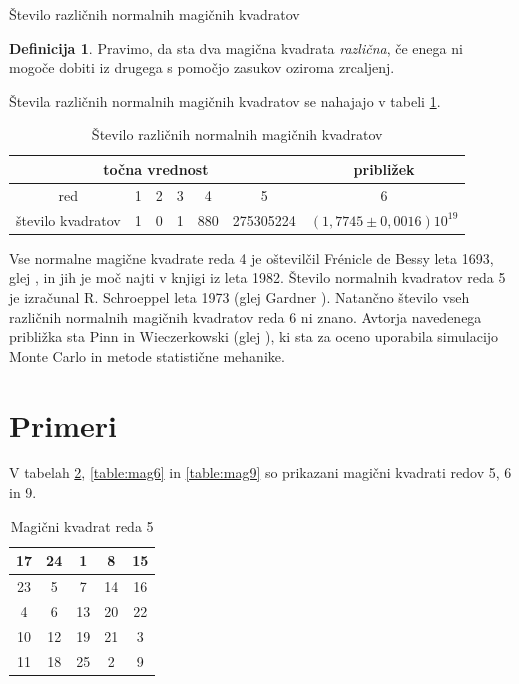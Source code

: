 \documentclass[12pt]{article}
\newcommand{\pojem}[1]{\emph{\color{purple}#1}}
\newenvironment{magic}[3]{
\begin{table}[!ht]
   \centering
   \caption{#2}
   \label{#3}
   \large
   \begin{tabular}{|*{#1}{c|}}\hline
}{
   \end{tabular}
   \normalsize
\end{table}
}
\theoremstyle{definition}
\newtheorem{definicija}{Definicija}
\theoremstyle{plain}
\begin{document}
Število različnih normalnih magičnih kvadratov

\begin{definicija}
      Pravimo, da sta dva magična kvadrata \pojem{različna}, če enega ni mogoče dobiti
      iz drugega s pomočjo zasukov oziroma zrcaljenj.
\end{definicija}

Števila različnih normalnih magičnih kvadratov se nahajajo v tabeli \ref{table:stevila}.

\begin{magic}{7}{Število različnih normalnih magičnih kvadratov}{table:stevila}
   \toprule
   \multicolumn{6}{c}{točna vrednost} & približek  \\ 
   \midrule
         red &1 &2 &3 &4 &5 &6  \\
         \hline
       število kvadratov & 1 & 0 & 1 & 880 & 275305224 & $(1{,}7745 \pm 0{,}0016)10^{19}$ \\
       \bottomrule
\end{magic}

Vse normalne magične kvadrate reda 4 je oštevilčil Frénicle de Bessy
leta 1693, glej \cite{bessy}, in jih je moč najti v knjigi \cite{berlekamp}
iz leta 1982. Število normalnih kvadratov reda 5 je izračunal
R. Schroeppel leta 1973 (glej Gardner \cite{gardner} ).
Natančno število vseh različnih normalnih magičnih kvadratov reda 6 ni znano.
Avtorja navedenega približka sta Pinn in Wieczerkowski (glej \cite{pinn}), ki
sta za oceno uporabila simulacijo Monte Carlo in metode statistične mehanike.


\section{Primeri}

V tabelah \ref{table:mag5}, \ref{table:mag6} in \ref{table:mag9} so prikazani
magični kvadrati redov 5, 6 in 9.


\begin{magic}{5}{Magični kvadrat reda 5}{table:mag5}
   17 & 24 &  1 &  8 & 15 \\\hline
   23 &  5 &  7 & 14 & 16 \\\hline
   4 &  6 & 13 & 20 & 22 \\\hline
   10 & 12 & 19 & 21 &  3 \\\hline
   11 & 18 & 25 &  2 &  9 \\\hline
\end{magic}
\end{document}
